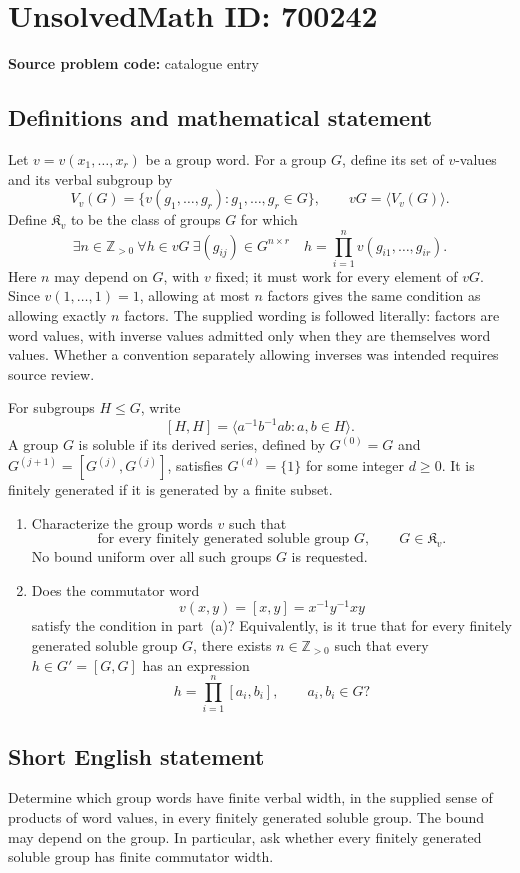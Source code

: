 \documentclass[11pt]{article}
\newcommand{\Z}{\mathbb{Z}}
\begin{document}
\section*{UnsolvedMath ID: 700242}
\textbf{Source problem code:} catalogue entry
\subsection{Definitions and mathematical statement}
Let \(v=v(x_1,\ldots,x_r)\) be a group word. For a group \(G\), define its set of \(v\)-values and its verbal subgroup by
\[
V_v(G)=\{v(g_1,\ldots,g_r):g_1,\ldots,g_r\in G\},
\qquad vG=\langle V_v(G)\rangle.
\]
Define \(\mathfrak K_v\) to be the class of groups \(G\) for which
\[
\exists n\in\Z_{>0}\ \forall h\in vG\ \exists (g_{ij})\in G^{n\times r}
\quad h=\prod_{i=1}^{n}v(g_{i1},\ldots,g_{ir}).
\]
Here \(n\) may depend on \(G\), with \(v\) fixed; it must work for every element of \(vG\). Since \(v(1,\ldots,1)=1\), allowing at most \(n\) factors gives the same condition as allowing exactly \(n\) factors. The supplied wording is followed literally: factors are word values, with inverse values admitted only when they are themselves word values. Whether a convention separately allowing inverses was intended requires source review.

For subgroups \(H\leq G\), write
\[
[H,H]=\langle a^{-1}b^{-1}ab:a,b\in H\rangle.
\]
A group \(G\) is soluble if its derived series, defined by \(G^{(0)}=G\) and \(G^{(j+1)}=[G^{(j)},G^{(j)}]\), satisfies \(G^{(d)}=\{1\}\) for some integer \(d\geq0\). It is finitely generated if it is generated by a finite subset.

\begin{enumerate}
\item[(a)] Characterize the group words \(v\) such that
\[
\text{for every finitely generated soluble group }G,
\qquad G\in\mathfrak K_v.
\]
No bound uniform over all such groups \(G\) is requested.
\item[(b)] Does the commutator word
\[
v(x,y)=[x,y]=x^{-1}y^{-1}xy
\]
satisfy the condition in part~(a)? Equivalently, is it true that for every finitely generated soluble group \(G\), there exists \(n\in\Z_{>0}\) such that every \(h\in G'=[G,G]\) has an expression
\[
h=\prod_{i=1}^{n}[a_i,b_i],\qquad a_i,b_i\in G?
\]
\end{enumerate}
\subsection{Short English statement}
Determine which group words have finite verbal width, in the supplied sense of products of word values, in every finitely generated soluble group. The bound may depend on the group. In particular, ask whether every finitely generated soluble group has finite commutator width.
\end{document}
